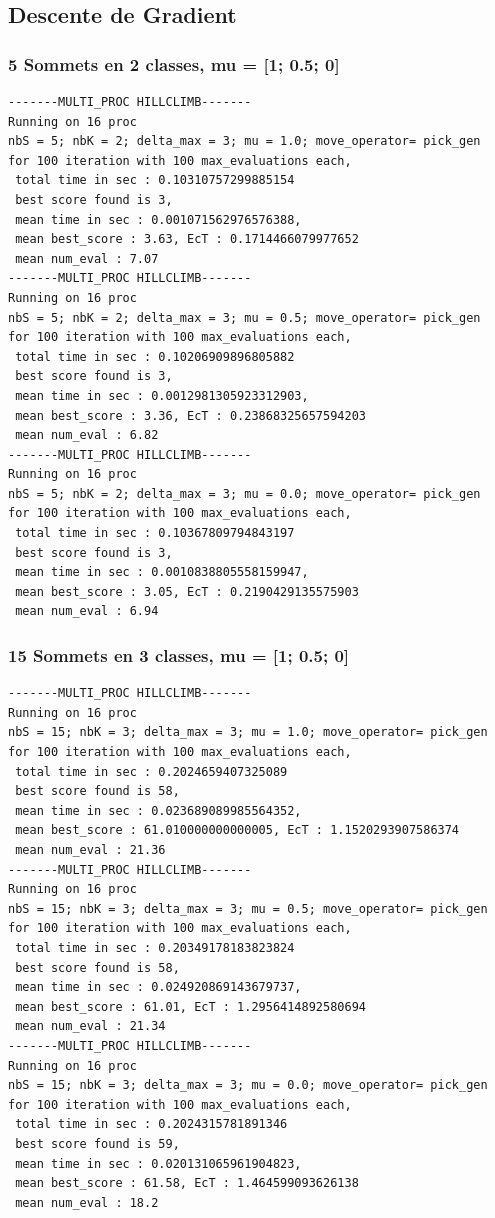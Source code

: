 \documentclass[a4paper]{article}
\begin{document}
\subsection{Descente de Gradient}
\subsubsection{5 Sommets en 2 classes, mu = [1; 0.5; 0]}
\begin{verbatim}
-------MULTI_PROC HILLCLIMB-------
Running on 16 proc
nbS = 5; nbK = 2; delta_max = 3; mu = 1.0; move_operator= pick_gen
for 100 iteration with 100 max_evaluations each, 
 total time in sec : 0.10310757299885154
 best score found is 3,
 mean time in sec : 0.001071562976576388,
 mean best_score : 3.63, EcT : 0.1714466079977652
 mean num_eval : 7.07
-------MULTI_PROC HILLCLIMB-------
Running on 16 proc
nbS = 5; nbK = 2; delta_max = 3; mu = 0.5; move_operator= pick_gen
for 100 iteration with 100 max_evaluations each, 
 total time in sec : 0.10206909896805882
 best score found is 3,
 mean time in sec : 0.0012981305923312903,
 mean best_score : 3.36, EcT : 0.23868325657594203
 mean num_eval : 6.82
-------MULTI_PROC HILLCLIMB-------
Running on 16 proc
nbS = 5; nbK = 2; delta_max = 3; mu = 0.0; move_operator= pick_gen
for 100 iteration with 100 max_evaluations each, 
 total time in sec : 0.10367809794843197
 best score found is 3,
 mean time in sec : 0.0010838805558159947,
 mean best_score : 3.05, EcT : 0.2190429135575903
 mean num_eval : 6.94
\end{verbatim}
\subsubsection{15 Sommets en 3 classes, mu = [1; 0.5; 0]}
\begin{verbatim}
-------MULTI_PROC HILLCLIMB-------
Running on 16 proc
nbS = 15; nbK = 3; delta_max = 3; mu = 1.0; move_operator= pick_gen
for 100 iteration with 100 max_evaluations each, 
 total time in sec : 0.2024659407325089
 best score found is 58,
 mean time in sec : 0.023689089985564352,
 mean best_score : 61.010000000000005, EcT : 1.1520293907586374
 mean num_eval : 21.36
-------MULTI_PROC HILLCLIMB-------
Running on 16 proc
nbS = 15; nbK = 3; delta_max = 3; mu = 0.5; move_operator= pick_gen
for 100 iteration with 100 max_evaluations each, 
 total time in sec : 0.20349178183823824
 best score found is 58,
 mean time in sec : 0.024920869143679737,
 mean best_score : 61.01, EcT : 1.2956414892580694
 mean num_eval : 21.34
-------MULTI_PROC HILLCLIMB-------
Running on 16 proc
nbS = 15; nbK = 3; delta_max = 3; mu = 0.0; move_operator= pick_gen
for 100 iteration with 100 max_evaluations each, 
 total time in sec : 0.2024315781891346
 best score found is 59,
 mean time in sec : 0.020131065961904823,
 mean best_score : 61.58, EcT : 1.464599093626138
 mean num_eval : 18.2
\end{verbatim}
\end{document}

